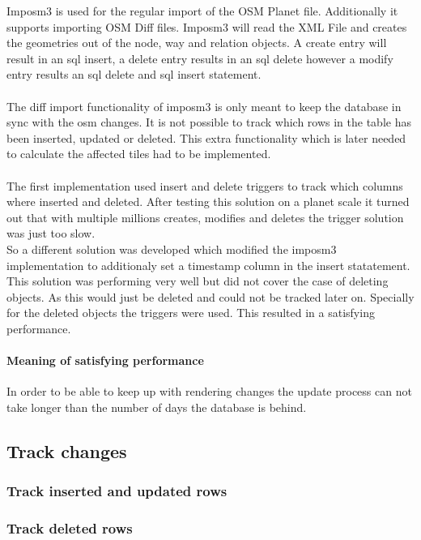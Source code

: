 Imposm3 is used for the regular import of the OSM Planet file. Additionally it supports importing OSM Diff files. Imposm3 will read the XML File and creates the geometries out of the node, way and relation objects. A create entry will result in an sql insert, a delete entry results in an sql delete however a modify entry results an sql delete and sql insert statement.\\\\
The diff import functionality of imposm3 is only meant to keep the database in sync with the osm changes. It is not possible to track which rows in the table has been inserted, updated or deleted. This extra functionality which is later needed to calculate the affected tiles had to be implemented.\\\\
The first implementation used insert and delete triggers to track which columns where inserted and deleted. After testing this solution on a planet scale it turned out that with multiple millions creates, modifies and deletes the trigger solution was just too slow.\\
So a different solution was developed which modified the imposm3 implementation to additionaly set a timestamp column in the insert statatement. This solution was performing very well but did not cover the case of deleting objects. As this would just be deleted and could not be tracked later on. Specially for the deleted objects the triggers were used. This resulted in a satisfying  performance. 

\paragraph{Meaning of satisfying performance} In order to be able to keep up with rendering changes the update process can not take longer than the number of days the database is behind.

\subsection{Track changes}

\subsubsection{Track inserted and updated rows}


\subsubsection{Track deleted rows}

